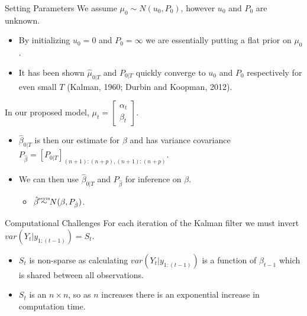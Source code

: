 \documentclass[
  ignorenonframetext,
]{beamer}
\providecommand{\tightlist}{%
  \setlength{\itemsep}{0pt}\setlength{\parskip}{0pt}}
\begin{document}
\begin{frame}{Setting Parameters}
\protect\hypertarget{setting-parameters}{}
We assume \(\mu_0 \sim N(u_0, P_0)\), however \(u_0\) and \(P_0\) are
unknown.

\begin{itemize}
\tightlist
\item
  By initializing \(u_0 = 0\) and \(P_0 = \infty\) we are essentially
  putting a flat prior on \(\mu_0\).
\item
  It has been shown \(\hat \mu_{0|T}\) and \(P_{0|T}\) quickly converge
  to \(u_0\) and \(P_0\) respectively for even small \(T\) (Kalman,
  1960; Durbin and Koopman, 2012).
\end{itemize}

In our proposed model,
\(\mu_t = \begin{bmatrix}\alpha_t \\ \beta_t\end{bmatrix}\).

\begin{itemize}
\tightlist
\item
  \(\hat\beta_{0|T}\) is then our estimate for \(\beta\) and has
  variance covariance
  \(P_{\hat\beta} = [P_{0|T}]_{(n+1):(n+p),(n+1):(n+p)}\).
\item
  We can then use \(\hat\beta_{0|T}\) and \(P_{\hat\beta}\) for
  inference on \(\beta\).

  \begin{itemize}
  \tightlist
  \item
    \(\hat \beta \mathrel{\stackrel{\makebox[0pt]{\mbox{\normalfont\tiny asym}}}{\sim}}N(\beta, P_{\hat\beta})\).
  \end{itemize}
\end{itemize}
\end{frame}

\begin{frame}{Computational Challenges}
\protect\hypertarget{computational-challenges}{}
For each iteration of the Kalman filter we must invert
\(var(Y_t|y_{1:(t-1)}) = S_t\).

\begin{itemize}
\tightlist
\item
  \(S_t\) is non-sparse as calculating \(var(Y_t|y_{1:(t-1)})\) is a
  function of \(\beta_{t-1}\) which is shared between all observations.
\item
  \(S_t\) is an \(n \times n\), so as \(n\) increases there is an
  exponential increase in computation time.
\end{itemize}
\end{frame}
\end{document}
